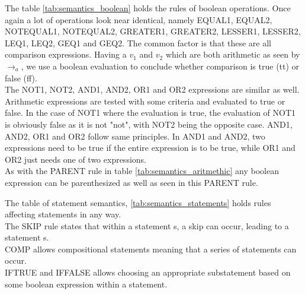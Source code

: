 The table \ref{tab:semantics_boolean} holds the rules of boolean operations. Once again a lot of operations look near identical, namely EQUAL1, EQUAL2, NOTEQUAL1, NOTEQUAL2, GREATER1, GREATER2, LESSER1, LESSER2, LEQ1, LEQ2, GEQ1 and GEQ2. The common factor is that these are all comparison expressions. Having a $v_{1}$ and $v_{2}$ which are both arithmetic as seen by $\rightarrow_{a}$, we use a boolean evaluation to conclude whether comparison is true (tt) or false (ff). \\
The NOT1, NOT2, AND1, AND2, OR1 and OR2 expressions are similar as well. Arithmetic expressions are tested with some criteria and evaluated to true or false. In the case of NOT1 where the evaluation is true, the evaluation of NOT1 is obviously false as it is not "not", with NOT2 being the opposite case. AND1, AND2, OR1 and OR2 follow same principles. In AND1 and AND2, two expressions need to be true if the entire expression is to be true, while OR1 and OR2 just needs one of two expressions. \\
As with the PARENT rule in table \ref{tab:semantics_aritmethic} any boolean expression can be parenthesized as well as seen in this PARENT rule.

The table of statement semantics, \ref{tab:semantics_statements} holds rules affecting statements in any way. \\
The SKIP rule states that within a statement s, a skip can occur, leading to a statement s. \\
COMP allows compositional statements meaning that a series of statements can occur. \\
IFTRUE and IFFALSE allows choosing an appropriate substatement based on some boolean expression within a statement. \\

